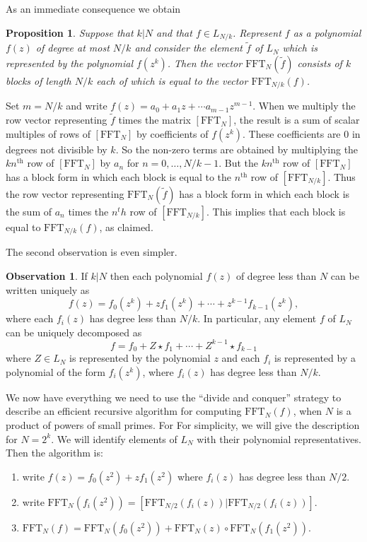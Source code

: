 \documentclass[12pt, letter, oneside]{amsart}
\theoremstyle{definition}
\newtheorem{observation}[para]{Observation}
\theoremstyle{plain}
\newtheorem{proposition}[para]{Proposition}
\numberwithin{equation}{para}
\numberwithin{figure}{section}
\newcommand{\FFT}{\text{FFT}}
\renewcommand{\th}{\text{th}}
\begin{document}
As an immediate consequence we obtain 
\begin{proposition}
Suppose that $k|N$ and that $f\in L_{N/k}$.  Represent $f$ as a
polynomial $f(z)$ of degree at most $N/k$ and consider the element
$\widetilde f$ of $L_N$ which is represented by the polynomial
$f(z^k)$.  Then the vector $\FFT_N(\widetilde f)$ consists of $k$
blocks of length $N/k$ each of which is equal to the vector
$\FFT_{N/k}(f)$.
\end{proposition}
\proof Set $m = N/k$ and write
$f(z) = a_0 + a_1z + \cdots a_{m-1}z^{m-1}$.  When we multiply the row
vector representing $\widetilde f$ times the matrix $[\FFT_N]$, the
result is a sum of scalar multiples of rows of $[\FFT_N]$ by
coefficients of $f(z^k)$.  These coefficients are $0$ in degrees not
divisible by $k$.  So the non-zero terms are obtained by multiplying
the $kn^\th$ row of $[\FFT_N]$ by $a_n$ for $n=0, \ldots, N/k-1$.  But
the $kn^\th$ row of $[\FFT_N]$ has a block form in which each block is
equal to the $n^\th$ row of $[\FFT_{N/k}]$.  Thus the row vector
representing $\FFT_N(\widetilde f)$ has a block form in which each
block is the sum of $a_n$ times the $n^th$ row of $[\FFT_{N/k}]$.
This implies that each block is equal to $\FFT_{N/k}(f)$, as claimed.
\endproof

The second observation is even simpler.
\begin{observation}\label{observation:decomposition}
If $k|N$ then each polynomial $f(z)$ of degree less than $N$ can be
written uniquely as
$$f(z) = f_0(z^k)+ zf_1(z^k) + \cdots + z^{k-1}f_{k-1}(z^k),$$
where each $f_i(z)$ has degree less than $N/k$.  In particular, any
element $f$ of $L_N$ can be uniquely decomposed as
$$f = f_0+ Z\star f_1 + \cdots + Z^{k-1}\star f_{k-1}$$
where $Z\in L_N$ is represented by the polynomial $z$ and each $f_i$
is represented by a polynomial of the form $f_i(z^k)$, where $f_i(z)$
has degree less than $N/k$.
\end{observation}

We now have everything we need to use the ``divide and conquer''
strategy to describe an efficient recursive algorithm for computing
$\FFT_N(f)$, when $N$ is a product of powers of small primes.  For For
simplicity, we will give the description for $N = 2^k$. We will
identify elements of $L_N$ with their polynomial representatives.
Then the algorithm is:

\begin{enumerate}
\item write $f(z) = f_0(z^2)+ zf_1(z^2)$ where $f_i(z)$ has degree less than $N/2$.
\item write $\FFT_N(f_i(z^2)) = [\FFT_{N/2}(f_i(z)) | \FFT_{N/2}(f_i(z))]$.
\item $\FFT_N(f) = \FFT_{N}(f_0(z^2)) + \FFT_{N}(z)\circ\FFT_{N}(f_1(z^2))$.
\end{enumerate}
\end{document}
